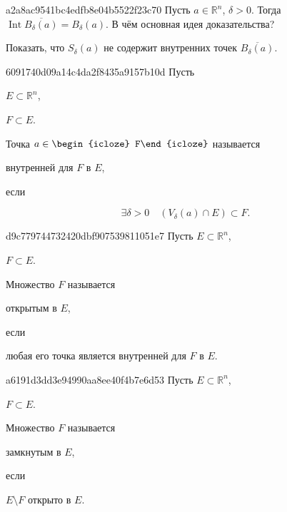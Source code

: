 \begin{note}{a2a8ac9541bc4edfb8e04b5522f23c70}
    Пусть \({ a \in \mathbb R^{n} }\),\: \({ \delta > 0 }\).
    Тогда \({ \operatorname{Int} \overline{B_\delta (a)} = B_\delta(a) }\).
    В чём основная идея доказательства?

    \begin{cloze}{1}
        Показать, что \({ S_\delta(a) }\) не содержит внутренних точек \({ \overline{B_\delta(a)} }\).
    \end{cloze}
\end{note}

\begin{note}{6091740d09a14c4da2f8435a9157b10d}
    Пусть \begin{icloze}{5}\({ E \subset \mathbb R^{n} }\),\end{icloze} \begin{icloze}{3}\({ F \subset E }\).\end{icloze}
    Точка \({ a \in \begin{icloze}{4}F\end{icloze} }\) называется \begin{icloze}{2}внутренней для \({ F }\) в \({ E }\),\end{icloze} если
    \begin{icloze}{1}
        \[
            \exists \delta > 0 \quad (V_{\delta}(a) \cap E) \subset F.
        \]
    \end{icloze}
\end{note}

\begin{note}{d9c779744732420dbf907539811051e7}
    Пусть \({ E \subset \mathbb R^{n} }\), \begin{icloze}{3}\({ F \subset E }\).\end{icloze}
    Множество \({ F }\) называется \begin{icloze}{2}открытым в \({ E }\),\end{icloze} если \begin{icloze}{1}любая его точка является внутренней для \({ F }\) в \({ E }\).\end{icloze}
\end{note}

\begin{note}{a6191d3dd3e94990aa8ee40f4b7e6d53}
    Пусть \({ E \subset \mathbb R^{n} }\), \begin{icloze}{3}\({ F \subset E }\).\end{icloze}
    Множество \({ F }\) называется \begin{icloze}{2}замкнутым в \({ E }\),\end{icloze} если \begin{icloze}{1}\({ E \setminus F }\) открыто в \({ E }\).\end{icloze}
\end{note}

